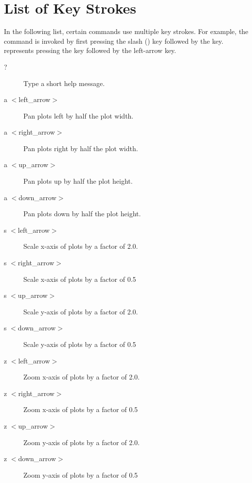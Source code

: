 \section{List of Key Strokes}
\label{s:keys}

In the following list, certain commands use multiple key strokes. For
example, the  command is invoked by first pressing the slash
() key followed by the  key. 
represents pressing the  key followed by the left-arrow key.

\begin{description}
\item[?]
Type a short help message.

\item[a $<$left\_arrow$>$]
Pan plots left by half the plot width.

\item[a $<$right\_arrow$>$]
Pan plots right by half the plot width.

\item[a $<$up\_arrow$>$]
Pan plots up by half the plot height.

\item[a $<$down\_arrow$>$]
Pan plots down by half the plot height.

\item[s $<$left\_arrow$>$]
Scale x-axis of plots by a factor of 2.0.

\item[s $<$right\_arrow$>$]
Scale x-axis of plots by a factor of 0.5

\item[s $<$up\_arrow$>$]
Scale y-axis of plots by a factor of 2.0.

\item[s $<$down\_arrow$>$]
Scale y-axis of plots by a factor of 0.5


\item[z $<$left\_arrow$>$]
Zoom x-axis of plots by a factor of 2.0.

\item[z $<$right\_arrow$>$]
Zoom x-axis of plots by a factor of 0.5

\item[z $<$up\_arrow$>$]
Zoom y-axis of plots by a factor of 2.0.

\item[z $<$down\_arrow$>$]
Zoom y-axis of plots by a factor of 0.5


\end{description}
